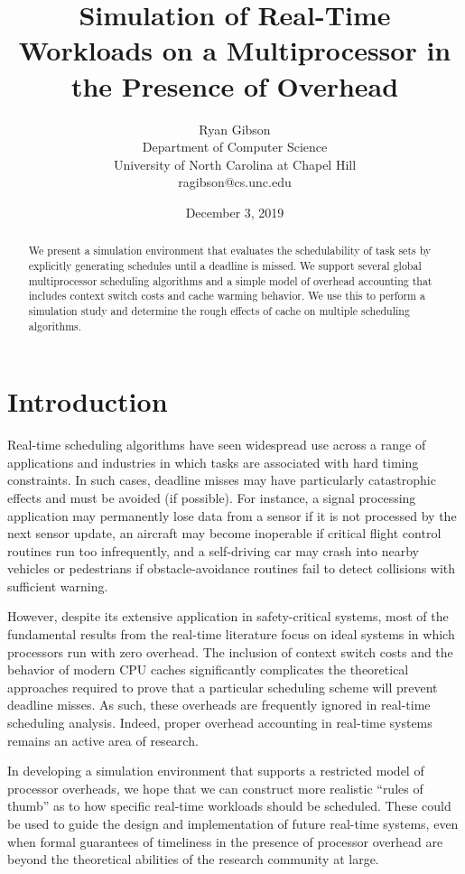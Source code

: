\documentclass[11pt]{article}
\title{\bf Simulation of Real-Time Workloads on a Multiprocessor in the Presence of Overhead}
\author{Ryan Gibson\\Department of Computer Science\\University of North Carolina at Chapel Hill\\ragibson@cs.unc.edu}
\date{December 3, 2019}
\begin{document}
	\maketitle
	
	\begin{abstract}
		We present a simulation environment that evaluates the schedulability of task sets by explicitly generating schedules until a deadline is missed. We support several global multiprocessor scheduling algorithms and a simple model of overhead accounting that includes context switch costs and cache warming behavior. We use this to perform a simulation study and determine the rough effects of cache on multiple scheduling algorithms.
	\end{abstract}

\section{Introduction}
\label{sec:Introduction}

Real-time scheduling algorithms have seen widespread use across a range of applications and industries in which tasks are associated with hard timing constraints. In such cases, deadline misses may have particularly catastrophic effects and must be avoided (if possible). For instance, a signal processing application may permanently lose data from a sensor if it is not processed by the next sensor update, an aircraft may become inoperable if critical flight control routines run too infrequently, and a self-driving car may crash into nearby vehicles or pedestrians if obstacle-avoidance routines fail to detect collisions with sufficient warning.

However, despite its extensive application in safety-critical systems, most of the fundamental results from the real-time literature focus on ideal systems in which processors run with zero overhead. The inclusion of context switch costs and the behavior of modern CPU caches significantly complicates the theoretical approaches required to prove that a particular scheduling scheme will prevent deadline misses. As such, these overheads are frequently ignored in real-time scheduling analysis. Indeed, proper overhead accounting in real-time systems remains an active area of research.

In developing a simulation environment that supports a restricted model of processor overheads, we hope that we can construct more realistic ``rules of thumb'' as to how specific real-time workloads should be scheduled. These could be used to guide the design and implementation of future real-time systems, even when formal guarantees of timeliness in the presence of processor overhead are beyond the theoretical abilities of the research community at large.
\end{document}
